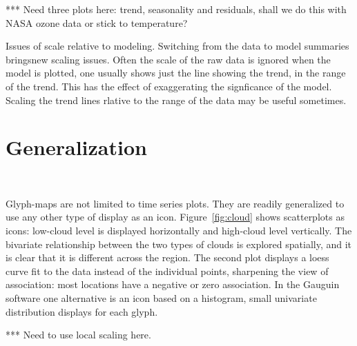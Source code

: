 \documentclass[oneside]{article}
\begin{document}

*** Need three plots here: trend, seasonality and residuals, shall we do this with NASA ozone data or stick to temperature?

Issues of scale relative to modeling. Switching from the data to model summaries bringsnew scaling issues. Often the scale of the raw data is ignored when the model is plotted, one usually shows just the line showing the trend, in the range of the trend. This has the effect of exaggerating the signficance of the model. Scaling the trend lines rlative to the range of the data may be useful sometimes.

\section{Generalization}~\label{sec:scatter}

Glyph-maps are not limited to time series plots. They are readily generalized to use any other type of display as an icon. Figure~\ref{fig:cloud} shows scatterplots as icons: low-cloud level is displayed horizontally and high-cloud level vertically. The bivariate relationship between the two types of clouds is explored spatially, and it is clear that it is different across the region. The second plot displays a loess curve fit to the data instead of the individual points, sharpening the view of association: most locations have a negative or zero association.   In the Gauguin software \citep{gribov:2006} one alternative is an icon based on a histogram, small univariate distribution displays for each glyph. 

*** Need to use local scaling here.
\end{document}
